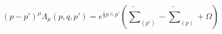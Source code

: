 \begin{equation}
(p-p')^{\mu}\Lambda_{\mu}(p,q,p')= e^{\frac{i}{2}p\wedge
p'}\left(\widetilde{\sum}_{(p')}-\widetilde{\sum}_{(p)}+\Omega\right)
\end{equation}

